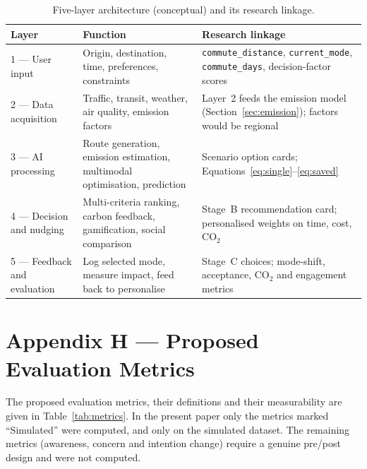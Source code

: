 \documentclass[11pt,a4paper]{article}
\newcommand{\code}[1]{\texttt{#1}}
\begin{document}
\begin{table}[H]
\centering
\small
\caption{Five-layer architecture (conceptual) and its research linkage.}
\label{tab:arch}
\begin{tabular}{@{}p{2.2cm}p{5.2cm}p{7.4cm}@{}}
\toprule
\textbf{Layer} & \textbf{Function} & \textbf{Research linkage}\\
\midrule
1 --- User input & Origin, destination, time, preferences, constraints & \code{commute\_distance}, \code{current\_mode}, \code{commute\_days}, decision-factor scores\\
2 --- Data acquisition & Traffic, transit, weather, air quality, emission factors & Layer~2 feeds the emission model (Section~\ref{sec:emission}); factors would be regional\\
3 --- AI processing & Route generation, emission estimation, multimodal optimisation, prediction & Scenario option cards; Equations~\ref{eq:single}--\ref{eq:saved}\\
4 --- Decision and nudging & Multi-criteria ranking, carbon feedback, gamification, social comparison & Stage~B recommendation card; personalised weights on time, cost, CO$_2$\\
5 --- Feedback and evaluation & Log selected mode, measure impact, feed back to personalise & Stage~C choices; mode-shift, acceptance, CO$_2$ and engagement metrics\\
\bottomrule
\end{tabular}
\end{table}

\section{Appendix H --- Proposed Evaluation Metrics}
\label{app:metrics}

The proposed evaluation metrics, their definitions and their measurability are given in
Table~\ref{tab:metrics}. In the present paper only the metrics marked ``Simulated'' were computed, and
only on the simulated dataset. The remaining metrics (awareness, concern and intention change) require
a genuine pre/post design and were not computed.
\end{document}
